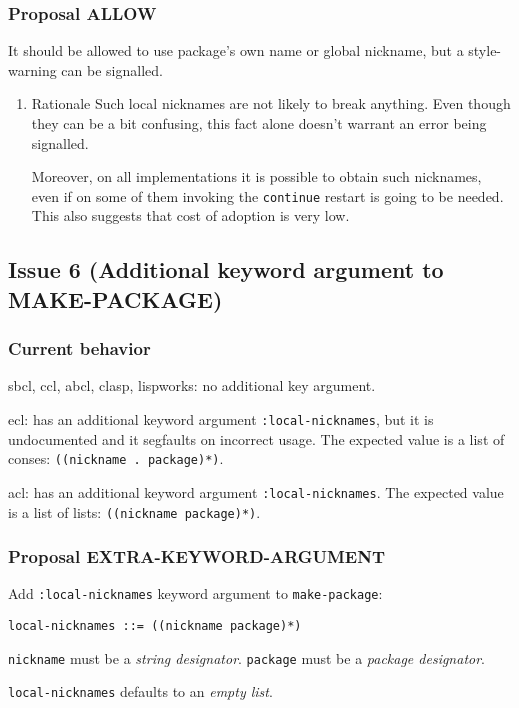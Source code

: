 \documentclass[11pt]{article}
\begin{document}
\subsubsection{Proposal ALLOW}
\label{sec:orgd7ee6f2}
It should be allowed to use package's own name or global nickname, but a
style-warning can be signalled.
\begin{enumerate}
\item Rationale
\label{sec:org49984eb}
Such local nicknames are not likely to break anything. Even though they can be a
bit confusing, this fact alone doesn't warrant an error being signalled.

Moreover, on all implementations it is possible to obtain such nicknames, even if
on some of them invoking the \texttt{continue} restart is going to be needed. This also
suggests that cost of adoption is very low.
\end{enumerate}

\subsection{Issue 6 (Additional keyword argument to MAKE-PACKAGE)}
\label{sec:orgd3fb702}
\subsubsection{Current behavior}
\label{sec:org04ba437}
sbcl, ccl, abcl, clasp, lispworks: no additional key argument.

ecl: has an additional keyword argument \texttt{:local-nicknames}, but it is undocumented
and it segfaults on incorrect usage. The expected value is a list of conses:
\texttt{((nickname . package)*)}.

acl: has an additional keyword argument \texttt{:local-nicknames}. The expected value is
a list of lists: \texttt{((nickname package)*)}.
\subsubsection{Proposal EXTRA-KEYWORD-ARGUMENT}
\label{sec:org09457bb}
Add \texttt{:local-nicknames} keyword argument to \texttt{make-package}:
\begin{verbatim}
local-nicknames ::= ((nickname package)*)
\end{verbatim}

\texttt{nickname} must be a \emph{string designator}.
\texttt{package} must be a \emph{package designator}.

\texttt{local-nicknames} defaults to an \emph{empty list}.
\end{document}
